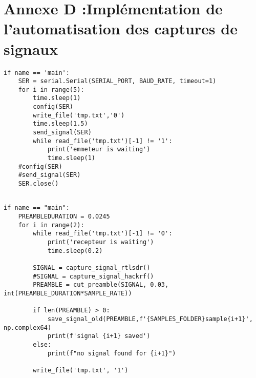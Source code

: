 \newpage

\section{Annexe D :Implémentation de l'automatisation des captures de signaux}\label{codeauto}

\begin{lstlisting}[style=pythonstyle, caption={Emetteur}, label={lst:python}]
if name == 'main':
    SER = serial.Serial(SERIAL_PORT, BAUD_RATE, timeout=1)
    for i in range(5):
        time.sleep(1)
        config(SER)
        write_file('tmp.txt','0')
        time.sleep(1.5)
        send_signal(SER)
        while read_file('tmp.txt')[-1] != '1':
            print('emmeteur is waiting')
            time.sleep(1)
    #config(SER)
    #send_signal(SER)
    SER.close()
\end{lstlisting}

\begin{lstlisting}[style=pythonstyle, caption={Récepteur}, label={lst:python}]

if name == "main":
    PREAMBLEDURATION = 0.0245
    for i in range(2):
        while read_file('tmp.txt')[-1] != '0':
            print('recepteur is waiting')
            time.sleep(0.2)

        SIGNAL = capture_signal_rtlsdr()
        #SIGNAL = capture_signal_hackrf()
        PREAMBLE = cut_preamble(SIGNAL, 0.03, int(PREAMBLE_DURATION*SAMPLE_RATE))

        if len(PREAMBLE) > 0:
            save_signal_old(PREAMBLE,f'{SAMPLES_FOLDER}sample{i+1}', np.complex64)
            print(f'signal {i+1} saved')
        else:
            print(f"no signal found for {i+1}")

        write_file('tmp.txt', '1')
\end{lstlisting}

